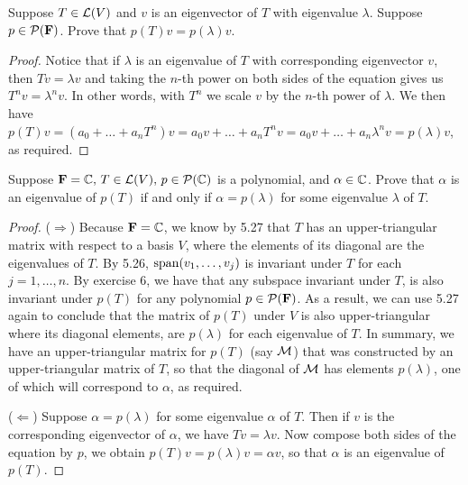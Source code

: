 \begin{exercise}{10}
  Suppose $T\in\mathcal{L}(V)$ and $v$ is an eigenvector of $T$ with eigenvalue $\lambda$. Suppose $p\in\mathcal{P}(\mathbf{F})$. Prove that $p(T)v=p(\lambda)v$.
\end{exercise}
\begin{proof}
 Notice that if $\lambda$ is an eigenvalue of $T$ with corresponding eigenvector $v$, then $Tv=\lambda v$ and taking the $n$-th power on both sides of the equation gives us $T^nv=\lambda^nv$. In other words, with $T^n$ we scale $v$ by the $n$-th power of $\lambda$. We then have $p(T)v= (a_0+\dots+a_nT^n)v= a_0v+\dots+a_nT^nv= a_0v+\dots+a_n\lambda^nv= p(\lambda)v$, as required.
\end{proof}

\begin{exercise}{11}
  Suppose $\mathbf{F}=\mathbb{C},\, T\in\mathcal{L}(V),\, p\in\mathcal{P}(\mathbb{C})$ is a polynomial, and $\alpha\in\mathbb{C}$. Prove that $\alpha$ is an eigenvalue of $p(T)$ if and only if $\alpha =p(\lambda)$ for some eigenvalue $\lambda$ of $T$.
\end{exercise}
\begin{proof}
 ($\Rightarrow$) Because $\mathbf{F}=\mathbb{C}$, we know by 5.27 that $T$ has an upper-triangular matrix with respect to a basis $V$, where the elements of its diagonal are the eigenvalues of $T$. By 5.26, $\operatorname*{span}(v_1,\dots,v_j)$ is invariant under $T$ for each $j=1,\dots,n$. By exercise 6, we have that any subspace invariant under $T$, is also invariant under $p(T)$ for any polynomial $p\in\mathcal{P}(\mathbf{F})$. As a result, we can use 5.27 again to conclude that the matrix of $p(T)$ under $V$ is also upper-triangular where its diagonal elements, are $p(\lambda)$ for each eigenvalue of $T$. In summary, we have an upper-triangular matrix for $p(T)$ (say $\mathcal{M}$) that was constructed by an upper-triangular matrix of $T$, so that the diagonal of $\mathcal{M}$ has elements $p(\lambda)$, one of which will correspond to $\alpha$, as required.

 ($\Leftarrow$) Suppose $\alpha =p(\lambda)$ for some eigenvalue $\alpha$ of $T$. Then if $v$ is the corresponding eigenvector of $\alpha$, we have $Tv=\lambda v$. Now compose both sides of the equation by $p$, we obtain $p(T)v= p(\lambda)v= \alpha v$, so that $\alpha$ is an eigenvalue of $p(T)$.
\end{proof}

